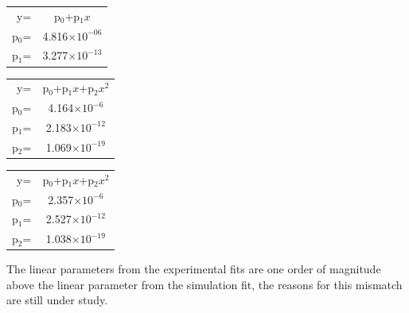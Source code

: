 \documentclass[a4paper]{article}
\begin{document}
\begin{table}[H]
\centering
\begin{tabular}{rc}
y=  & p$_0$+p$_1x$            \\
p$_0$= & 4.816$\times10^{-06}$\\
p$_1$= & 3.277$\times10^{-13}$ 
\end{tabular}
\end{table}

\begin{table}[H]
\centering
\begin{tabular}{rc}
y=  & p$_0$+p$_1x$+p$_2x^2$   \\
p$_0$= & 4.164$\times10^{-6}$ \\
p$_1$= & 2.183$\times10^{-12}$\\
p$_2$= & 1.069$\times10^{-19}$                 
\end{tabular}
\end{table}

\begin{table}[H]
\centering
\begin{tabular}{rc}
y=  & p$_0$+p$_1x$+p$_2x^2$   \\
p$_0$= & 2.357$\times10^{-6}$ \\
p$_1$= & 2.527$\times10^{-12}$\\
p$_2$= & 1.038$\times10^{-19}$                 
\end{tabular}
\end{table}

The linear parameters from the experimental fits are one order of magnitude above the linear parameter from the simulation fit, the reasons for this mismatch are still under study.
\end{document}
